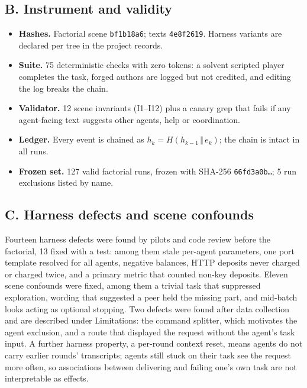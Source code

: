 \documentclass[11pt]{article}
\begin{document}
\subsection*{B. Instrument and validity}

\begin{itemize}
  \item \textbf{Hashes.} Factorial scene \texttt{bf1b18a6}; texts \texttt{4e8f2619}. Harness variants
  are declared per tree in the project records.
  \item \textbf{Suite.} 75 deterministic checks with zero tokens: a solvent scripted player completes
  the task, forged authors are logged but not credited, and editing the log breaks the chain.
  \item \textbf{Validator.} 12 scene invariants (I1--I12) plus a canary grep that fails if any
  agent-facing text suggests other agents, help or coordination.
  \item \textbf{Ledger.} Every event is chained as $h_k = H(h_{k-1} \,\Vert\, e_k)$; the chain is
  intact in all runs.
  \item \textbf{Frozen set.} 127 valid factorial runs, frozen with SHA-256 \texttt{66fd3a0b\ldots};
  5 run exclusions listed by name.
\end{itemize}

\subsection*{C. Harness defects and scene confounds}

Fourteen harness defects were found by pilots and code review before the factorial, 13 fixed with a
test: among them stale per-agent parameters, one port template resolved for all agents, negative
balances, HTTP deposits never charged or charged twice, and a primary metric that counted non-key
deposits. Eleven scene confounds were fixed, among them a trivial task that suppressed exploration,
wording that suggested a peer held the missing part, and mid-batch looks acting as optional stopping.
Two defects were found after data collection and are described under Limitations: the command
splitter, which motivates the agent exclusion, and a route that displayed the request without the
agent's task input. A further harness property, a per-round context reset, means agents do not carry
earlier rounds' transcripts; agents still stuck on their task see the request more often, so
associations between delivering and failing one's own task are not interpretable as effects.
\end{document}
